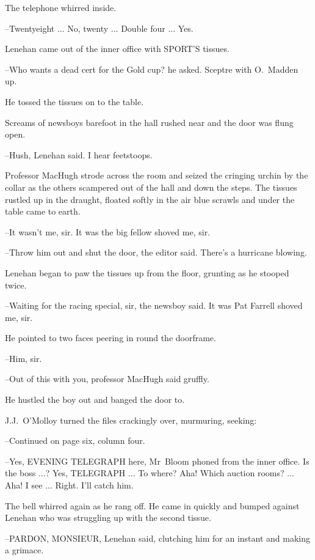 The telephone whirred inside.

--Twentyeight ...
No, twenty ...
Double four ...
Yes.



Lenehan came out of the inner office with SPORT'S tissues.

--Who wants a dead cert for the Gold cup?
he asked.
Sceptre with O.~Madden up.

He tossed the tissues on to the table.

Screams of newsboys barefoot in the hall rushed near
and the door was flung open.

--Hush,
Lenehan said.
I hear feetstoops.

Professor MacHugh strode across the room
and seized the cringing urchin by the collar
as the others scampered out of the hall and down the steps.
The tissues rustled up in the draught,
floated softly in the air
blue scrawls
and under the table came to earth.

--It wasn't me, sir.
It was the big fellow shoved me, sir.

--Throw him out and shut the door,
the editor said.
There's a hurricane blowing.

Lenehan began to paw the tissues up from the floor,
grunting as he stooped twice.

--Waiting for the racing special, sir,
the newsboy said.
It was Pat Farrell shoved me, sir.

He pointed to two faces peering in round the doorframe.

--Him, sir.

--Out of this with you,
professor MacHugh said gruffly.

He hustled the boy out and banged the door to.

J.J.~O'Molloy turned the files crackingly over,
murmuring,
seeking:

--Continued on page six, column four.

--Yes, EVENING TELEGRAPH here,
Mr~Bloom phoned from the inner office.
Is the boss ...?
Yes, TELEGRAPH ...
To where?
Aha!
Which auction rooms? ...
Aha!
I see ...
Right.
I'll catch him.



The bell whirred again as he rang off.
He came in quickly and bumped against Lenehan
who was struggling up with the second tissue.

--PARDON, MONSIEUR,
Lenehan said,
clutching him for an instant
and making a grimace.

